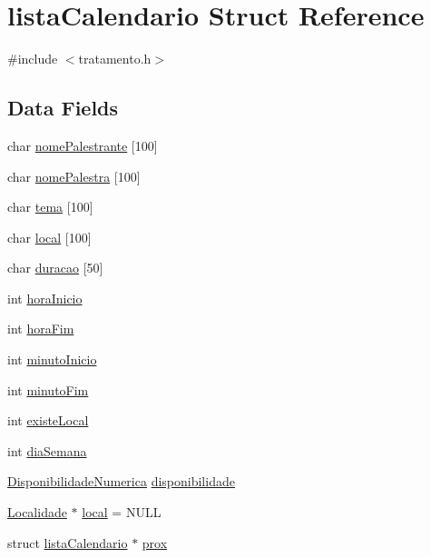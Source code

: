 \hypertarget{structlista_calendario}{}\section{lista\+Calendario Struct Reference}
\label{structlista_calendario}


{\ttfamily \#include $<$tratamento.\+h$>$}

\subsection*{Data Fields}
\begin{DoxyCompactItemize}
\item 
char \hyperlink{structlista_calendario_af31dd10e6cbda382c5fcb72a1d7e34ff}{nome\+Palestrante} \mbox{[}100\mbox{]}
\item 
char \hyperlink{structlista_calendario_adc5cb057e15c10f55e77627c34ca1442}{nome\+Palestra} \mbox{[}100\mbox{]}
\item 
char \hyperlink{structlista_calendario_a016fbc0f5fcc04c86b0e98087a05de7e}{tema} \mbox{[}100\mbox{]}
\item 
char \hyperlink{structlista_calendario_a54690e427de6e41449561872eaf814fe}{local} \mbox{[}100\mbox{]}
\item 
char \hyperlink{structlista_calendario_ae0b35c399889e7c6f5cd9fbd9230b295}{duracao} \mbox{[}50\mbox{]}
\item 
int \hyperlink{structlista_calendario_a5495bac9e9c2b1154d018a03a2786397}{hora\+Inicio}
\item 
int \hyperlink{structlista_calendario_abade366a6a790fc6164d1b360522e6e3}{hora\+Fim}
\item 
int \hyperlink{structlista_calendario_a12abfd10f7bc791e8ec4f457078271c6}{minuto\+Inicio}
\item 
int \hyperlink{structlista_calendario_af994944b0c6881ec51c00cf9c1a1aa10}{minuto\+Fim}
\item 
int \hyperlink{structlista_calendario_a39959b4363385a2403605ed7d5455233}{existe\+Local}
\item 
int \hyperlink{structlista_calendario_ae690627c5917afdb91c1cd98478cea7e}{dia\+Semana}
\item 
\hyperlink{tratamento_8h_af779d477c92ad861dee2a119587f3285}{Disponibilidade\+Numerica} \hyperlink{structlista_calendario_a39461700e4a56deb19d0f72952dccb3d}{disponibilidade}
\item 
\hyperlink{lista_local_8h_aefd163bdd3ba8384e6091a1c54ccc54f}{Localidade} $\ast$ \hyperlink{structlista_calendario_a3bf3cf676229af995eb354cde98e733c}{local} = N\+U\+L\+L
\item 
struct \hyperlink{structlista_calendario}{lista\+Calendario} $\ast$ \hyperlink{structlista_calendario_a1baa22779e03a190ac11515e1d0e7964}{prox}
\end{DoxyCompactItemize}


